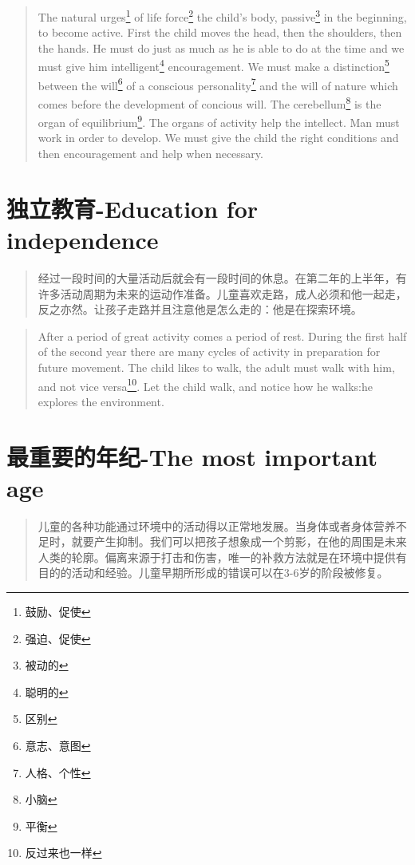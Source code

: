 \documentclass[lang=cn,10pt]{elegantbook}
\begin{document}
\begin{tcolorbox}
\begin{quote}
{\small The natural urges\footnote{鼓励、促使} of life force\footnote{强迫、促使} the child's body, passive\footnote{被动的} in the beginning, to become active. First the child moves the head, then the shoulders, then the hands. He must do just as much as he is able to do at the time and we must give him intelligent\footnote{聪明的} encouragement. We must make a distinction\footnote{区别} between the will\footnote{意志、意图} of a conscious personality\footnote{人格、个性} and the will of nature which comes before the development of concious will. The cerebellum\footnote{小脑} is the organ of equilibrium\footnote{平衡}. The organs of activity help the intellect. Man must work in order to develop. We must give the child the right conditions and then encouragement and help when necessary.}
\end{quote}
\end{tcolorbox}


\chapter{独立教育-Education for independence}

\begin{quote}
{\small 经过一段时间的大量活动后就会有一段时间的休息。在第二年的上半年，有许多活动周期为未来的运动作准备。儿童喜欢走路，成人必须和他一起走，反之亦然。让孩子走路并且注意他是怎么走的：他是在探索环境。}
\end{quote}

\begin{tcolorbox}
\begin{quote}
{\small After a period of great activity comes a period of rest. During the first half of the second year there are many cycles of activity in preparation for future movement. The child likes to walk, the adult must walk with him, and not vice versa\footnote{反过来也一样}. Let the child walk, and notice how he walks:he explores the environment.}
\end{quote}
\end{tcolorbox}


\chapter{最重要的年纪-The most important age}

\begin{quote}
{\small 儿童的各种功能通过环境中的活动得以正常地发展。当身体或者身体营养不足时，就要产生抑制。我们可以把孩子想象成一个剪影，在他的周围是未来人类的轮廓。偏离来源于打击和伤害，唯一的补救方法就是在环境中提供有目的的活动和经验。儿童早期所形成的错误可以在3-6岁的阶段被修复。}
\end{quote}
\end{document}

